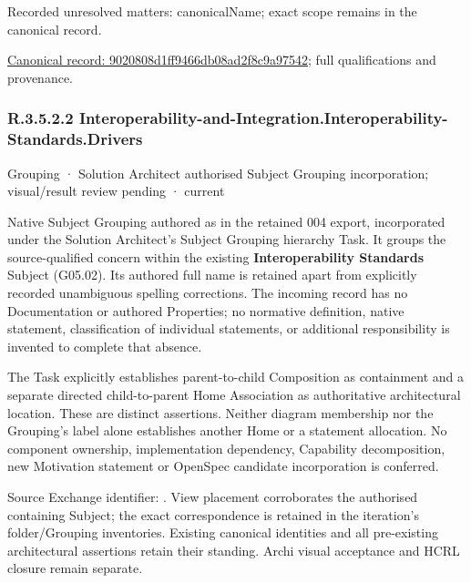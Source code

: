 {\small Recorded unresolved matters: canonicalName; exact scope remains in the canonical record.}\par
{\footnotesize \href{../../../../continuum/grouping/9020808d1ff9466db08ad2f8c9a97542.md}{Canonical record: 9020808d1ff9466db08ad2f8c9a97542}; full qualifications and provenance.}\par
\subsubsection*{R.3.5.2.2 Interoperability-and-Integration.Interoperability-Standards.Drivers}
\label{navigation:R.3.5.2.2}

\label{element:bc45121331a04af7a54e790bd4a7ea6e}
{\small Grouping · Solution Architect authorised Subject Grouping incorporation; visual/result review pending · current}\par

Native Subject Grouping authored as \texttt{} in the retained 004 export,
incorporated under the Solution Architect's Subject Grouping hierarchy Task.
It groups the source-qualified \texttt{} concern within
the existing \textbf{Interoperability Standards} Subject (G05.02). Its authored full name
is retained apart from explicitly recorded unambiguous spelling corrections.
The incoming record has no Documentation or authored Properties; no normative
definition, native statement, classification of individual statements, or
additional responsibility is invented to complete that absence.



The Task explicitly establishes parent-to-child Composition as containment and
a separate directed child-to-parent Home Association as authoritative architectural
location. These are distinct assertions. Neither diagram membership nor the
Grouping's label alone establishes another Home or a statement allocation.
No component ownership, implementation dependency, Capability decomposition,
new Motivation statement or OpenSpec candidate incorporation is conferred.



Source Exchange identifier: \texttt{}. View placement corroborates
the authorised containing Subject; the exact correspondence is retained in the
iteration's folder/Grouping inventories. Existing canonical identities and all
pre-existing architectural assertions retain their standing. Archi visual
acceptance and HCRL closure remain separate.


